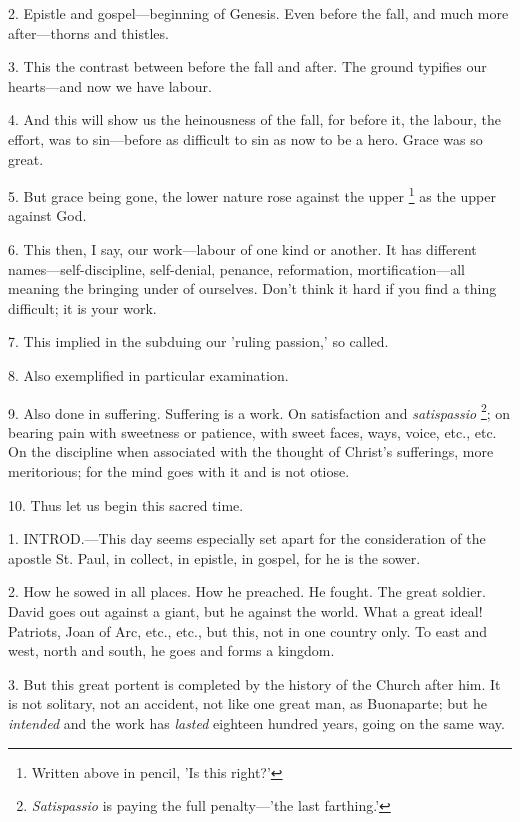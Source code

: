 2. Epistle and gospel—beginning of Genesis.
Even before the fall, and much more after—thorns and thistles.

3. This the contrast between before the fall and
after. The ground typifies our hearts—and now we have labour.

4. And this will show us the heinousness of the
fall, for before it, the labour, the effort, was to sin—before as
difficult to sin as now to be a hero. Grace was so great.

5. But grace being gone, the lower nature rose
against the upper \footnote{Written above in pencil,
'Is this right?'} as
the upper against God.

6. This then, I say, our work—labour of one
kind or another. It has different names—self-discipline,
self-denial, penance, reformation, mortification—all meaning the
bringing under of ourselves. Don't think it hard if you find a thing
difficult; it is your work.

7. This implied in the subduing our 'ruling
passion,' so called.

8. Also exemplified in particular examination.

9. Also done in suffering. Suffering is a work.
On satisfaction and \emph{satispassio} \footnote{\emph{Satispassio} is
paying the full penalty—'the last farthing.'}; on bearing pain with sweetness or patience, with sweet faces,
ways, voice, etc., etc. On the discipline when associated with the
thought of Christ's sufferings, more meritorious; for the mind goes
with it and is not otiose.

10. Thus let us begin this sacred time.


1. INTROD.—This
day seems especially set apart for the consideration of the apostle
St. Paul, in collect, in epistle, in gospel, for he is the sower.

2. How he sowed in all places. How he preached.
He fought. The great soldier. David goes out against a giant, but he
against the world. What a great ideal! Patriots, Joan of Arc, etc.,
etc., but this, not in one country only. To east and west, north and
south, he goes and forms a kingdom.

3. But this great portent is completed by the
history of the Church after him. It is not solitary, not an
accident, not like one great man, as Buonaparte; but he \emph{intended}
and the work has \emph{lasted} eighteen hundred years, going on the
same way.

